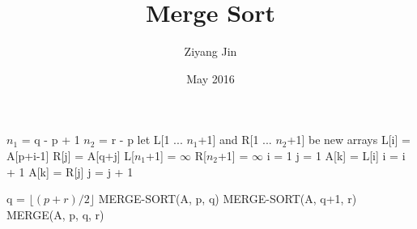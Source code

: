 \documentclass{article}
\title{Merge Sort}
\author{Ziyang Jin}
\date{May 2016}
\begin{document}
\begin{algorithm}
\begin{algorithmic}[1]
\State $n_1$ = q - p + 1
\State $n_2$ = r - p
\State let L[1 ... $n_1$+1] and R[1 ... $n_2$+1] be new arrays
    \State L[i] = A[p+i-1]
\EndFor
{}
    \State R[j] = A[q+j]
\EndFor
\State L[$n_1$+1] = $\infty$
\State R[$n_2$+1] = $\infty$
\State i = 1
\State j = 1
        \State A[k] = L[i]
        \State i = i + 1
    \Else
        \State A[k] = R[j]
        \State j = j + 1
    \EndIf
\EndFor
\EndProcedure
\end{algorithmic}
\end{algorithm}  


\begin{algorithm}
\begin{algorithmic}[1]
    \State q = $\lfloor{(p+r)/2}\rfloor$
    \State MERGE-SORT(A, p, q)
    \State MERGE-SORT(A, q+1, r)
    \State MERGE(A, p, q, r)
\EndIf
\EndProcedure
\end{algorithmic}
\end{algorithm}
\end{document}
